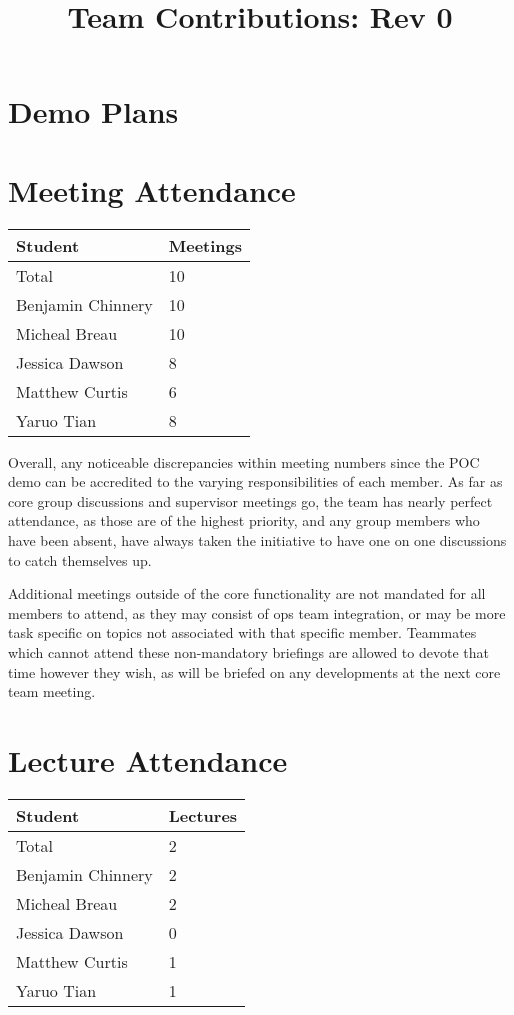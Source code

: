 \documentclass{article}
\title{Team Contributions: Rev 0\\\progname}
\author{\authname}
\date{}
\begin{document}
\maketitle

\section{Demo Plans}


\section{Meeting Attendance}

\begin{table}[H]
\centering
\begin{tabular}{ll}
\toprule
\textbf{Student} & \textbf{Meetings}\\
\midrule
Total & 10\\
Benjamin Chinnery & 10\\
Micheal Breau & 10\\
Jessica Dawson & 8\\
Matthew Curtis & 6\\
Yaruo Tian & 8\\
\bottomrule
\end{tabular}
\end{table}
Overall, any noticeable discrepancies within meeting numbers since the POC demo can be accredited to the varying responsibilities of each member. As far as core group discussions and supervisor meetings go, the team has nearly perfect attendance, as those are of the highest priority, and any group members who have been absent, have always taken the initiative to have one on one discussions to catch themselves up.

Additional meetings outside of the core functionality are not mandated for all members to attend, as they may consist of ops team integration, or may be more task specific on topics not associated with that specific member. Teammates which cannot attend these non-mandatory briefings are allowed to devote that time however they wish, as will be briefed on any developments at the next core team meeting.


\section{Lecture Attendance}

\begin{table}[H]
\centering
\begin{tabular}{ll}
\toprule
\textbf{Student} & \textbf{Lectures}\\
\midrule
Total & 2\\
Benjamin Chinnery & 2\\
Micheal Breau & 2\\
Jessica Dawson & 0\\
Matthew Curtis & 1\\
Yaruo Tian & 1\\
\bottomrule
\end{tabular}
\end{table}
\end{document}

